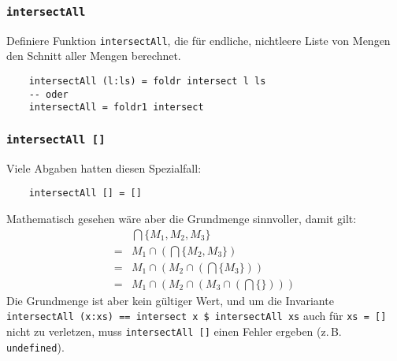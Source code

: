 \documentclass{beamer}
\begin{document}
\begin{frame}[fragile]
  \frametitle{\lstinline{intersectAll}}
  Definiere Funktion \lstinline{intersectAll}, die für endliche, nichtleere Liste von Mengen den Schnitt aller Mengen berechnet.
  \pause
  \begin{lstlisting}
    intersectAll (l:ls) = foldr intersect l ls
    -- oder
    intersectAll = foldr1 intersect
  \end{lstlisting}
\end{frame}

\begin{frame}[fragile]
  \frametitle{\lstinline{intersectAll []}}
  Viele Abgaben hatten diesen Spezialfall:
  \begin{lstlisting}
    intersectAll [] = []
  \end{lstlisting}
  Mathematisch gesehen wäre aber die Grundmenge sinnvoller, damit gilt:
  \begin{align*}
    & \bigcap \{ M_1, M_2, M_3 \} \\
    = & M_1 \cap \left(\bigcap \{ M_2, M_3 \}\right) \\
    = & M_1 \cap \left(M_2 \cap \left(\bigcap \{ M_3 \}\right)\right) \\
    = & M_1 \cap \left(M_2 \cap \left(M_3 \cap \left(\bigcap \{\}\right)\right)\right)
  \end{align*}
  Die Grundmenge ist aber kein gültiger Wert,
  und um die Invariante \lstinline{intersectAll (x:xs) == intersect x $ intersectAll xs} auch für \lstinline{xs = []} nicht zu verletzen,
  muss \lstinline{intersectAll []} einen Fehler ergeben
  (z.\,B. \lstinline{undefined}).
\end{frame}
\end{document}
